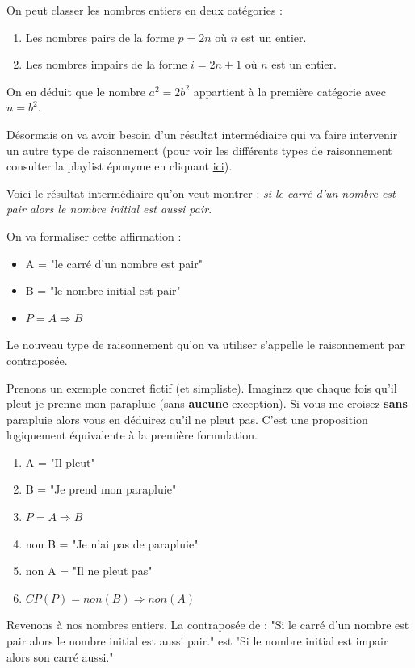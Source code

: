 \documentclass[a4paper, 11pt, twoside]{book}
\begin{document}
On peut classer les nombres entiers en deux catégories :
\begin{enumerate}
\item Les nombres pairs de la forme \(p = 2n\) où \(n\) est un entier.
\item Les nombres impairs de la forme \(i = 2n + 1\) où \(n\) est un
entier.
\end{enumerate}

On en déduit que le nombre \(a^2 = 2b^2\) appartient à la première
catégorie avec \(n = b^2\).

Désormais on va avoir besoin d'un résultat intermédiaire qui va
faire intervenir un autre type de raisonnement (pour voir les
différents types de raisonnement consulter la playlist éponyme en
cliquant \href{https://www.youtube.com/watch?v=R\_L4NEgIxPM\&list=PLwWStLtwGECb-3dJmBXOYc8oQw1mRsrep\&pp=iAQB}{ici}).

Voici le résultat intermédiaire qu'on veut montrer : \emph{si le carré
d'un nombre est pair alors le nombre initial est aussi pair}.

On va formaliser cette affirmation :
\begin{itemize}
\item A = "le carré d'un nombre est pair"
\item B = "le nombre initial est pair"
\item \(P = A\Rightarrow B\)
\end{itemize}

Le nouveau type de raisonnement qu'on va utiliser s'appelle le
raisonnement par contraposée.

Prenons un exemple concret fictif (et simpliste). Imaginez que
chaque fois qu'il pleut je prenne mon parapluie (sans \textbf{aucune}
exception). Si vous me croisez \textbf{sans} parapluie alors vous en
déduirez qu'il ne pleut pas. C'est une proposition logiquement
équivalente à la première formulation.

\begin{enumerate}
\item A = "Il pleut"
\item B = "Je prend mon parapluie"
\item \(P = A\Rightarrow B\)
\item non B = "Je n'ai pas de parapluie"
\item non A = "Il ne pleut pas"
\item \(CP(P) = non(B)\Rightarrow non(A)\)
\end{enumerate}

Revenons à nos nombres entiers. La contraposée de : "Si le carré
d'un nombre est pair alors le nombre initial est aussi pair." est
"Si le nombre initial est impair alors son carré aussi."
\end{document}
